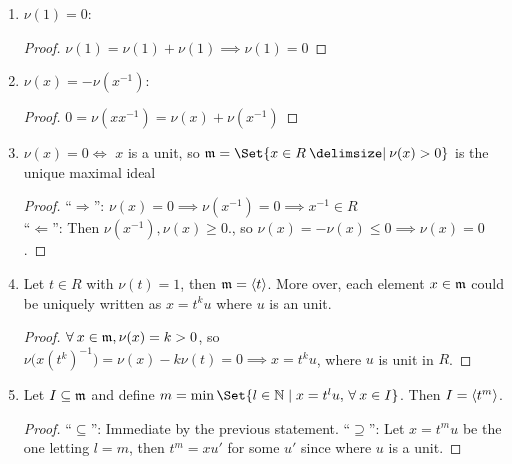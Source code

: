 \begin{prop} \hfill \label{prop:property-of-dvr}
\begin{enumerate}
  \item $\nu(1) = 0$:
    \begin{proof}
      $\nu(1) = \nu(1) + \nu(1) \implies \nu(1) = 0$
    \end{proof}
  \item $\nu(x) = -\nu(x^{-1})$:
    \begin{proof}
      $0 = \nu(xx^{-1}) = \nu(x) + \nu(x^{-1})$
    \end{proof}
  \item $\nu(x) = 0 \iff$ $x$ is a unit,
    so $\mf = \Set{x \in R \given \nu(x) > 0}$ is the unique maximal ideal
    \begin{proof}
      ``$\Rightarrow$'': $\nu(x) = 0 \implies \nu(x^{-1}) = 0 \implies x^{-1} \in R$ \\
      ``$\Leftarrow$'':
        Then $\nu(x^{-1}), \nu(x) \ge 0.$, so $\nu(x) = -\nu(x) \le 0 \implies
        \nu(x) = 0$.
    \end{proof}
  \item Let $t \in R$ with $\nu(t) = 1$, then $\mathfrak{m} = \langle t\rangle$.
    More over, each element $x \in \mathfrak{m}$ could be uniquely written as $x = t^k u$
    where $u$ is an unit.
    \begin{proof}
      $\forall x \in \mf, \nu(x) = k > 0$, so $\nu\big(x(t^k)^{-1}\big) =
      \nu(x) - k\nu(t) = 0 \implies x = t^ku$, where $u$ is unit in $R$.
    \end{proof}
  \item Let $I \subseteq \mathfrak{m}$ and define
    $m = \min\Set{l \in \Nb \mid x = t^l u, \, \forall x \in I}$.
    Then $I = \langle t^m\rangle$.
    \begin{proof}
      ``$\subseteq$'': Immediate by the previous statement.
      ``$\supseteq$'': Let $x = t^m u$ be the one letting $l = m$,
      then $t^m = x u'$ for some $u'$ since where $u$ is a unit.
    \end{proof}
\end{enumerate}
\end{prop}

